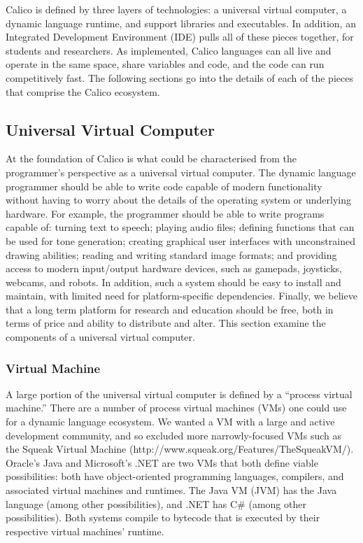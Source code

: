 \documentclass[preprint]{sigplanconf}
\begin{document}
Calico is defined by three layers of technologies: a universal virtual
computer, a dynamic language runtime, and support libraries and
executables. In addition, an Integrated Development Environment (IDE)
pulls all of these pieces together, for students and researchers. As
implemented, Calico languages can all live and operate in the same
space, share variables and code, and the code can run competitively
fast. The following sections go into the details of each of the pieces
that comprise the Calico ecosystem.

\subsection{Universal Virtual Computer}

At the foundation of Calico is what could be characterised from the
programmer's perspective as a universal virtual computer. The dynamic
language programmer should be able to write code capable of modern
functionality without having to worry about the details of the
operating system or underlying hardware. For example, the programmer
should be able to write programs capable of: turning text to speech;
playing audio files; defining functions that can be used for tone
generation; creating graphical user interfaces with unconstrained
drawing abilities; reading and writing standard image formats; and
providing access to modern input/output hardware devices, such as
gamepads, joysticks, webcams, and robots. In addition, such a system
should be easy to install and maintain, with limited need for
platform-specific dependencies. Finally, we believe that a long term
platform for research and education should be free, both in terms of
price and ability to distribute and alter. This section examine the
components of a universal virtual computer.

\subsubsection{Virtual Machine}

A large portion of the universal virtual computer is defined by a
``process virtual machine.'' There are a number of process virtual
machines (VMs) one could use for a dynamic language ecosystem. We
wanted a VM with a large and active development community, and so
excluded more narrowly-focused VMs such as the Squeak Virtual Machine
(http://www.squeak.org/Features/TheSqueakVM/). Oracle's Java and
Microsoft's .NET are two VMs that both define viable possibilities:
both have object-oriented programming languages, compilers, and
associated virtual machines and runtimes. The Java VM (JVM) has the
Java language (among other possibilities), and .NET has C\# (among
other possibilities). Both systems compile to bytecode that is
executed by their respective virtual machines' runtime.
\end{document}
